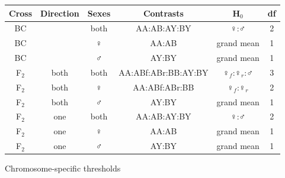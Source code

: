 \documentclass[12pt]{article}
\newcommand{\headsize}{\fontsize{35}{35} \selectfont}
\newcommand{\smallsize}{\fontsize{25}{30} \selectfont}
\newcommand{\smallersize}{\fontsize{20}{25} \selectfont}
\begin{document}
\smallersize \color{mywhite}
\vspace{2cm}

\begin{center}
\setlength{\tabcolsep}{12pt}
\renewcommand{\arraystretch}{1.5}
\noindent \begin{tabular}{cccccc} \hline
{\color{myblue} Cross} & {\color{myblue} Direction} & {\color{myblue} Sexes} & {\color{myblue} Contrasts} & {\color{myblue} H$_{\text{0}}$} & {\color{myblue} df} \\ \hline
BC & & both& AA:AB:AY:BY & $\female$:$\male$ & 2
  \\
BC & & $\female$ & AA:AB & grand mean & 1 \\
BC & & $\male$ & AY:BY & grand mean & 1 \\ \hline
F$_{\text{2}}$ & both & both & AA:ABf:ABr:BB:AY:BY & $\female_{f}$:$\female_{r}$:$\male$ & 3 \\
F$_{\text{2}}$ & both & $\female$ & AA:ABf:ABr:BB & $\female_{f}$:$\female_{r}$ & 2
  \\
F$_{\text{2}}$ & both & $\male$ & AY:BY & grand mean & 1 \\
F$_{\text{2}}$ & one  & both & AA:AB:AY:BY & $\female$:$\male$ & 2 \\
F$_{\text{2}}$ & one  & $\female$ & AA:AB & grand mean & 1 \\
F$_{\text{2}}$ & one  & $\male$ & AY:BY & grand mean & 1 \\
\hline
\end{tabular} \end{center}



\newpage

\headsize \color{myyellow}
\hfill \begin{minipage}{5.75in}
\centering
Chromosome-specific thresholds
\end{minipage}

\vspace{2cm}

\color{mywhite} \smallsize
\end{document}
